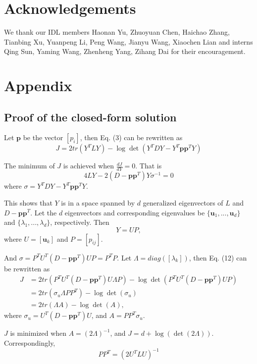 \documentclass{article}
\begin{document}
\section*{Acknowledgements}
We thank our IDL members Haonan Yu, Zhuoyuan Chen, Haichao Zhang, Tianbing Xu,
Yuanpeng Li, Peng Wang, Jianyu Wang, Xiaochen Lian and interns Qing Sun, Yaming Wang, 
Zhenheng Yang, Zihang Dai for their encouragement.





\appendix
\section{Appendix}
\subsection{Proof of the closed-form solution}
Let $\mathbf{p}$ be the vector $[p_i]$, then Eq. (3) can be rewritten as
\begin{equation}
J = 2tr(Y^TLY) - \log\det(Y^TDY - Y^T\mathbf{p}\mathbf{p}^TY)
\end{equation}

The minimum of $J$ is achieved when $\frac{dJ}{dY}=0$. That is
\begin{equation}
4LY - 2(D-\mathbf{p}\mathbf{p}^T)Y\sigma^{-1} = 0
\end{equation}
where $\sigma = Y^TDY - Y^T\mathbf{p}\mathbf{p}^TY$.

This shows that $Y$ is in a space spanned by $d$ generalized eigenvectors of
$L$ and $D-\mathbf{p}\mathbf{p}^T$. Let the $d$ eigenvectors and corresponding
eigenvalues be $\{\mathbf{u}_1, ..., \mathbf{u}_d\}$ and $\{\lambda_1, ..., \lambda_d\}$, respectively.
Then 
\begin{equation}
Y = UP,
\end{equation}
where $U=[\mathbf{u}_k]$ and $P=[p_{ij}]$.

And $\sigma=P^TU^T(D-\mathbf{pp}^T)UP = P^TP$.
Let $\Lambda = diag([\lambda_k])$, then Eq. (12) can be rewritten as 
\begin{align}
J &= 2tr(P^TU^T(D-\mathbf{pp}^T)U\Lambda P) - \log\det(P^TU^T(D-\mathbf{pp}^T)UP) \\
  &= 2tr(\sigma_u\Lambda PP^T) - \log\det(\sigma_u) \\
  &= 2tr(\Lambda A) - \log\det(A),
\end{align}
where $\sigma_u = U^T(D-\mathbf{pp}^T)U$, and $A = PP^T\sigma_u$.

$J$ is minimized when $A = (2\Lambda)^{-1}$, and $J = d + \log(\det(2\Lambda))$.
Correspondingly,
\begin{equation}
PP^T = (2U^TLU)^{-1}
\end{equation}
\end{document}
